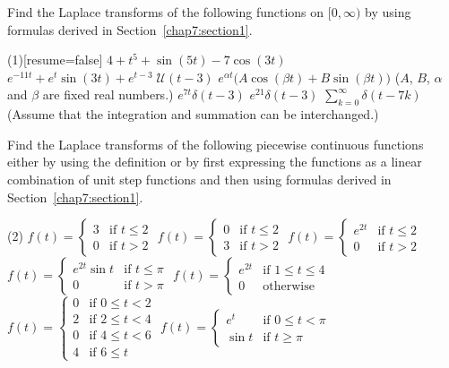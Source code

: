 \setcounter{Exercise}{0}
\begin{Exercise}\label{EX71}
	\vspace{-\baselineskip}%
	
		\Question Find the Laplace transforms of the following functions on $[0, \infty)$ by using formulas derived in Section~\ref{chap7:section1}.
	\begin{tasks}(1)[resume=false]
		\task\label{EX71-1-i} $4+t^5+\sin(5t)-7\cos (3t)$     
		\task $e^{-11t}+ e^t\sin(3t)+ e^{t-3}\;\mathcal{U}(t-3)$ 
		\task\label{EX71-1-iii} $e^{\alpha t} \big(A\cos(\beta t)+B\sin(\beta t)\big)$ \quad ($A$, $B$, $\alpha$ and $\beta$ are fixed real numbers.)
		\task  $ e^{7t}\delta(t-3)$ 
		\task $ e^{21}\delta(t-3)$ 
		\task $\sum_{k=0}^\infty \delta(t-7k)$  (Assume that the integration and summation can be interchanged.)
	\end{tasks}

	\Question 
	Find the Laplace transforms of the following piecewise continuous functions either by using the definition or by first expressing the functions as a linear combination of unit step functions and then using formulas derived in Section~\ref{chap7:section1}.
	\begin{tasks}[resume=false](2)
		\task\label{EX71-2-iv} $f(t) = \begin{cases}
			3&\text{if } t\le 2\\
			0&\text{if } t>2
		\end{cases}$
		\task $f(t) = \begin{cases}
			0&\text{if } t\le 2\\
			3&\text{if } t>2
		\end{cases}$
		\task $f(t) = \begin{cases}
			e^{2t}&\text{if } t\le 2\\
			0&\text{if } t>2
		\end{cases}$
		\task $f(t) = \begin{cases}
			e^{2t}\sin t&\text{if } t\le \pi\\
			0&\text{if } t>\pi
		\end{cases}$
		\task $f(t) = \begin{cases}
			e^{2t}&\text{if } 1\le t\le 4\\
			0&\text{otherwise}
		\end{cases}$
		\task $f(t) = \begin{cases}
			0&\text{if } 0\le t< 2\\
			2&\text{if } 2\le t< 4\\
			0&\text{if } 4\le t< 6\\
			4&\text{if } 6\le t
		\end{cases}$
		\task $f(t) = \begin{cases}
			e^t&\text{if } 0\le t< \pi\\
			\sin t&\text{if } t\ge \pi
		\end{cases}$
	\end{tasks}
	

\end{Exercise}
